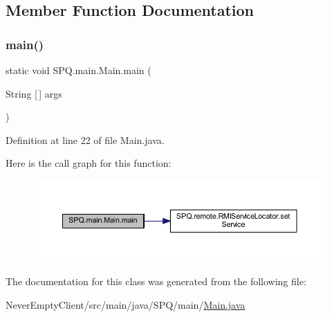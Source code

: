 \subsection{Member Function Documentation}
\mbox{\label{class_s_p_q_1_1main_1_1_main_ac7d2350f6924287c711b7e2bf1c430fa}} 
\subsubsection{\texorpdfstring{main()}{main()}}
{\footnotesize\ttfamily static void S\+P\+Q.\+main.\+Main.\+main (\begin{DoxyParamCaption}\item[{String \mbox{[}$\,$\mbox{]}}]{args }\end{DoxyParamCaption})\hspace{0.3cm}{\ttfamily [static]}}



Definition at line 22 of file Main.\+java.

Here is the call graph for this function\+:\nopagebreak
\begin{figure}[H]
\begin{center}
\leavevmode
\includegraphics[width=350pt]{class_s_p_q_1_1main_1_1_main_ac7d2350f6924287c711b7e2bf1c430fa_cgraph}
\end{center}
\end{figure}


The documentation for this class was generated from the following file\+:\begin{DoxyCompactItemize}
\item 
Never\+Empty\+Client/src/main/java/\+S\+P\+Q/main/\mbox{\hyperlink{_main_8java}{Main.\+java}}\end{DoxyCompactItemize}
